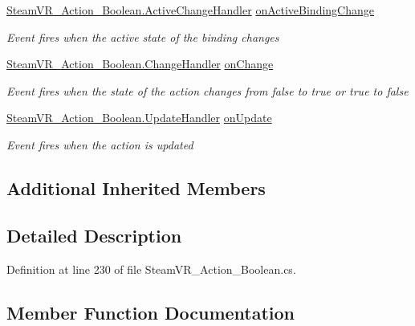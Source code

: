 \begin{DoxyCompactItemize}
\mbox{\hyperlink{class_valve_1_1_v_r_1_1_steam_v_r___action___boolean_af9f3044d5e4868485945b70d907c6bbb}{Steam\+V\+R\+\_\+\+Action\+\_\+\+Boolean.\+Active\+Change\+Handler}} \mbox{\hyperlink{class_valve_1_1_v_r_1_1_steam_v_r___action___boolean___source_a39d21e4fc6f670f9289b2acd0c2c2bf3}{on\+Active\+Binding\+Change}}
\begin{DoxyCompactList}\small\item\em Event fires when the active state of the binding changes \end{DoxyCompactList}\item 
\mbox{\hyperlink{class_valve_1_1_v_r_1_1_steam_v_r___action___boolean_a9dbdff089d05d822688005fa19fef120}{Steam\+V\+R\+\_\+\+Action\+\_\+\+Boolean.\+Change\+Handler}} \mbox{\hyperlink{class_valve_1_1_v_r_1_1_steam_v_r___action___boolean___source_a3499c4f9a10e45562c36d84f2cd0f834}{on\+Change}}
\begin{DoxyCompactList}\small\item\em Event fires when the state of the action changes from false to true or true to false \end{DoxyCompactList}\item 
\mbox{\hyperlink{class_valve_1_1_v_r_1_1_steam_v_r___action___boolean_ab9ee21a88a5d5d23603465c55796fcf5}{Steam\+V\+R\+\_\+\+Action\+\_\+\+Boolean.\+Update\+Handler}} \mbox{\hyperlink{class_valve_1_1_v_r_1_1_steam_v_r___action___boolean___source_a415211a4f88a14bcd67b25bf9daff709}{on\+Update}}
\begin{DoxyCompactList}\small\item\em Event fires when the action is updated \end{DoxyCompactList}\end{DoxyCompactItemize}
\subsection*{Additional Inherited Members}


\subsection{Detailed Description}


Definition at line 230 of file Steam\+V\+R\+\_\+\+Action\+\_\+\+Boolean.\+cs.



\subsection{Member Function Documentation}
\mbox{\label{class_valve_1_1_v_r_1_1_steam_v_r___action___boolean___source_abf7892da581c5adc54514e02df609b4c}} 
